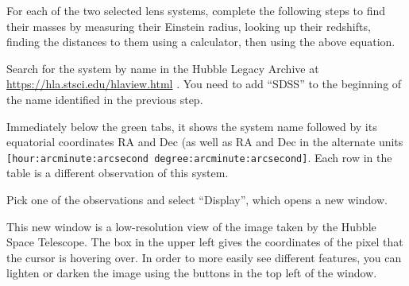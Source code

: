 For each of the two selected lens systems, complete the following steps to find their masses by measuring their Einstein radius, looking up their redshifts, finding the distances to them using a calculator, then using the above equation.

\begin{steps}	
	
	\item Search for the system by name in the Hubble Legacy Archive at \url{https://hla.stsci.edu/hlaview.html} . You need to add ``SDSS'' to the beginning of the name identified in the previous step.
\end{steps}
	
Immediately below the green tabs, it shows the system name followed by its equatorial coordinates RA and Dec (as well as RA and Dec in the alternate units \texttt{[hour:arcminute:arcsecond degree:arcminute:arcsecond]}. Each row in the table is a different observation of this system.

\begin{steps}	
	\item Pick one of the observations and select ``Display'', which opens a new window.
\end{steps}

This new window is a low-resolution view of the image taken by the Hubble Space Telescope. The box in the upper left gives the coordinates of the pixel that the cursor is hovering over. In order to more easily see different features, you can lighten or darken the image using the buttons in the top left of the window.

